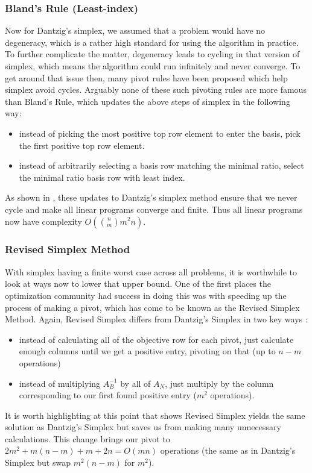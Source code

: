 \documentclass[11pt]{article}
\begin{document}
\subsubsection{Bland's Rule (Least-index)}
Now for Dantzig's simplex, we assumed that a problem would have no degeneracy, which is a rather high standard for using the algorithm in practice. To further complicate the matter, degeneracy leads to cycling in that version of simplex, which means the algorithm could run infinitely and never converge. To get around that issue then, many pivot rules have been proposed which help simplex avoid cycles. Arguably none of these such pivoting rules are more famous than Bland's Rule, which updates the above steps of simplex in the following way:
\begin{itemize}
	\item instead of picking the most positive top row element to enter the basis, pick the first positive top row element.
	\item instead of arbitrarily selecting a basis row matching the minimal ratio, select the minimal ratio basis row with least index.
\end{itemize}
As shown in \cite{bland}, these updates to Dantzig's simplex method ensure that we never cycle and make all linear programs converge and finite. Thus all linear programs now have complexity $O(\binom{n}{m}m^2n)$.

\subsubsection{Revised Simplex Method}
With simplex having a finite worst case across all problems, it is worthwhile to look at ways now to lower that upper bound. One of the first places the optimization community had success in doing this was with speeding up the process of making a pivot, which has come to be known as the Revised Simplex Method. Again, Revised Simplex differs from Dantzig's Simplex in two key ways \cite{revised}:
\begin{itemize}
	\item instead of calculating all of the objective row for each pivot, just calculate enough columns until we get a positive entry, pivoting on that (up to $n-m$ operations)
	\item instead of multiplying $A_B^{-1}$ by all of $A_N$, just multiply by the column corresponding to our first found positive entry ($m^2$ operations).
\end{itemize}
It is worth highlighting at this point that \cite{revised} shows Revised Simplex yields the same solution as Dantzig's Simplex but saves us from making many unnecessary calculations. This change brings our pivot to $2 m^2 + m (n - m) + m + 2 n = O(mn)$ operations (the same as in Dantzig's Simplex but swap $m^2(n-m)$ for $m^2$).
\end{document}

